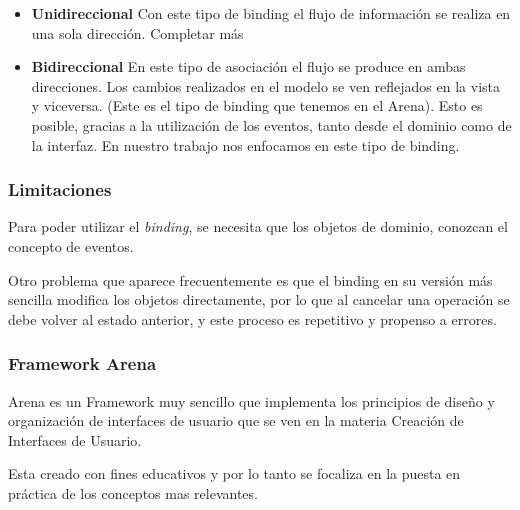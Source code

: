 	\begin {itemize}
	
		\item {\bf Unidireccional}
		Con este tipo de binding el flujo de información se realiza en una sola dirección.
		{Completar más}
		
		
		\item {\bf Bidireccional}
		En este tipo de asociación el flujo se produce en ambas direcciones. Los cambios
		realizados en el modelo se ven reflejados  en la vista y viceversa. (Este es el
		tipo de binding que tenemos en el Arena). Esto es posible, gracias a la
		utilización de los eventos, tanto desde el dominio como de la interfaz.
		En nuestro trabajo nos enfocamos en este tipo de binding.
		
	
	\end {itemize}
	


\subsubsection{Limitaciones}
	Para poder utilizar el \emph{binding}, se necesita que los objetos de dominio, 
	conozcan el concepto de eventos.
	
	Otro problema que aparece frecuentemente es que el binding en su versión más 
	sencilla modifica los objetos directamente, por lo que al cancelar una operación 
	se debe volver al estado anterior, y este proceso es repetitivo y propenso a errores. 

	
\subsubsection{Framework Arena}
	Arena es un Framework muy sencillo que implementa los principios de diseño y
	organización de interfaces de usuario que se ven en la materia Creación de
	Interfaces de Usuario.
	
	Esta creado con fines educativos y por lo tanto se focaliza en la puesta en
	práctica de los conceptos mas relevantes.